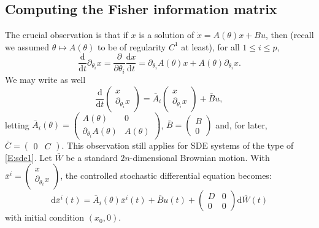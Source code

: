 \documentclass[a4paper]{article}
\theoremstyle{definition}
\theoremstyle{remark}
\newcommand{\diff}{\mathrm{d}}
\begin{document}
\subsection{Computing the Fisher information matrix}\label{S:computing-FIM}

The crucial observation is that if $x$ is a solution of $\dot x=A(\theta) x+Bu$, then (recall we assumed $\theta\mapsto A(\theta)$ to be of regularity $C^1$ at least), for all $1\leq i\leq p$,
$$
\frac{\diff}{\diff t} \partial_{\theta_i} x= \frac{\partial}{\partial \theta_i} \frac{\diff x}{\diff t}= \partial_{\theta_i} A(\theta)x + A(\theta) \partial_{\theta_i} x.
$$
We may write as well
$$
\frac{\diff}{\diff t}
\begin{pmatrix}
x
\\
\partial_{\theta_i} x
\end{pmatrix}
=
\bar A_i
\begin{pmatrix}
x
\\
\partial_{\theta_i} x
\end{pmatrix}
+
\bar B u,
$$
letting 
$\bar A_i(\theta)=\begin{pmatrix}
    A(\theta) & 0
    \\
    \partial_{\theta_i}A(\theta) & A(\theta)
\end{pmatrix}$,
$\bar B=\begin{pmatrix}
    B
    \\
    0
    \end{pmatrix}$ and, for later, $\bar C=\begin{pmatrix}
0&C
\end{pmatrix}$.
This observation still applies for SDE systems of the type of \eqref{E:sde1}.
Let $\bar W$ be a standard $2n$-dimensional Brownian motion. With $\bar x^i=\begin{pmatrix}
x
\\
\partial_{\theta_i} x
\end{pmatrix}$,
the controlled stochastic differential equation becomes:
\begin{equation}\label{E:sde2}
\diff \bar x^i(t)
=
\bar A_i(\theta)
\bar x^i(t)
+
\bar B u(t)
+
\begin{pmatrix}
D & 0
\\
0 & 0
\end{pmatrix}\diff \bar W(t)
\end{equation}
with initial condition $(x_0,0)$.
\end{document}
